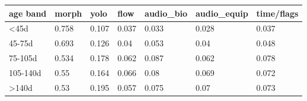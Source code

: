 \begin{tabular}{lllllll}
\hline
age band & morph & yolo & flow & audio\_bio & audio\_equip & time/flags \\
\hline
<45d & 0.758 & 0.107 & 0.037 & 0.033 & 0.028 & 0.037 \\
45-75d & 0.693 & 0.126 & 0.04 & 0.053 & 0.04 & 0.048 \\
75-105d & 0.534 & 0.178 & 0.062 & 0.087 & 0.062 & 0.078 \\
105-140d & 0.55 & 0.164 & 0.066 & 0.08 & 0.069 & 0.072 \\
>140d & 0.53 & 0.195 & 0.057 & 0.075 & 0.07 & 0.073 \\
\hline
\end{tabular}
